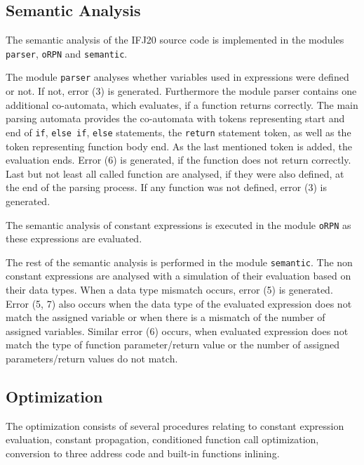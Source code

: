\documentclass[12pt]{article}
\begin{document}
\subsection{Semantic Analysis}
\label{sec:semanalysis}
The semantic analysis of the IFJ20 source code is implemented in the modules \texttt{parser}, \texttt{oRPN} and \texttt{semantic}. \par
The module \texttt{parser} analyses whether variables used in expressions were defined or not. If not, error (3) is generated. Furthermore the module parser contains one additional co-automata, which evaluates, if a function returns correctly. The main parsing automata provides the co-automata with tokens representing start and end of \texttt{if}, \texttt{else if}, \texttt{else} statements, the \texttt{return} statement token, as well as the token representing function body end. As the last mentioned token is added, the evaluation ends. Error (6) is generated, if the function does not return correctly. Last but not least all called function are analysed, if they were also defined, at the end of the parsing process. If any function was not defined, error (3) is generated. \par
The semantic analysis of constant expressions is executed in the module \texttt{oRPN} as these expressions are evaluated. \par
The rest of the semantic analysis is performed in the module \texttt{semantic}. The non constant expressions are analysed with a simulation of their evaluation based on their data types. When a data type mismatch occurs, error (5) is generated. Error (5, 7) also occurs when the data type of the evaluated expression does not match the assigned variable or when there is a mismatch of the number of assigned variables. Similar error (6) occurs, when evaluated expression does not match the type of function parameter/return value or the number of assigned parameters/return values do not match.

\subsection{Optimization} 
\label{sec:optimization}
The optimization consists of several procedures relating to constant expression evaluation, constant propagation, conditioned function call optimization, conversion to three address code and built-in functions inlining.
\end{document}
